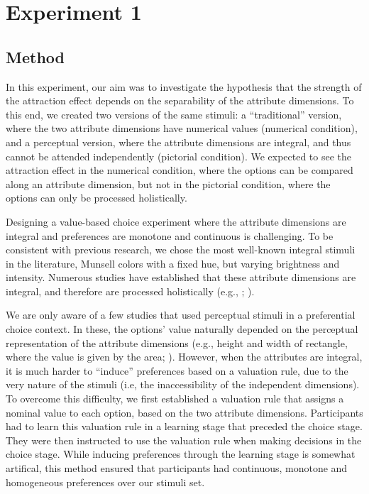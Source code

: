 \documentclass[11pt,a4paper]{article}
\begin{document}
\section{Experiment 1} 


\subsection{Method}

In this experiment, our aim was to investigate the hypothesis that the strength of the attraction effect depends on the separability of the attribute dimensions. To this end, we created two versions of the same stimuli: a ``traditional'' version, where the two attribute dimensions have numerical values (numerical condition), and a perceptual version, where the attribute dimensions are integral, and thus cannot be attended independently (pictorial condition). We expected to see the attraction effect in the numerical condition, where the options can be compared along an attribute dimension, but not in the pictorial condition, where the options can only be processed holistically.

Designing a value-based choice experiment where the attribute dimensions are integral and preferences are monotone and continuous is challenging. To be consistent with previous research, we chose the most well-known integral stimuli in the literature, Munsell colors with a fixed hue, but varying brightness and intensity. Numerous studies have established that these attribute dimensions are integral, and therefore are processed holistically (e.g., ; ). 

We are only aware of a few studies that used perceptual stimuli in a preferential choice context. In these, the options' value naturally depended on the perceptual representation of the attribute dimensions (e.g., height and width of rectangle, where the value is given by the area;  ). However, when the attributes are integral, it is much harder to ``induce'' preferences based on a valuation rule, due to the very nature of the stimuli (i.e, the inaccessibility of the independent dimensions). To overcome this difficulty, we first established a valuation rule that assigns a nominal value to each option, based on the two attribute dimensions. Participants had to learn this valuation rule in a learning stage that preceded the choice stage. They were then instructed to use the valuation rule when making decisions in the choice stage. While inducing preferences through the learning stage is somewhat artifical, this method ensured that participants had continuous, monotone and homogeneous preferences over our stimuli set. 
\end{document}
